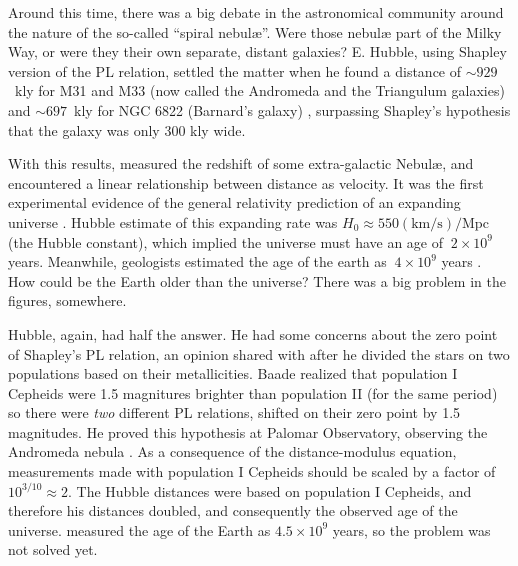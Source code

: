 
Around this time, there was a big debate in the astronomical community around the nature of the so-called \enquote{spiral nebul\ae{}}.
Were those nebul\ae{} part of the Milky Way, or were they their own separate, distant galaxies?
E. Hubble, using Shapley version of the PL relation, settled the matter when he found a distance of $\sim929$~kly for M31 and M33 
(now called the Andromeda and the Triangulum galaxies) and $\sim697$~kly for NGC 6822 (Barnard's galaxy) \citep{Hubble1925a,Hubble1925b}, 
surpassing Shapley's hypothesis that the galaxy was only 300 kly wide.


With this results, \cite{Hubble1929} measured the redshift of some extra-galactic Nebul\ae{}, 
and encountered a linear relationship between distance as velocity.
It was the first experimental evidence of the general relativity prediction of an expanding universe \citep{Fiedmann1922,Lemaitre1927}.
Hubble estimate of this expanding rate was $H_0 \approx 550 (\text{km}/\text{s})/\text{Mpc}$ (the Hubble constant), 
which implied the universe must have an age of $~2\times10^9$ years. 
Meanwhile, geologists estimated the age of the earth as $~4\times10^9$ years \citep[see][ for an historical account]{Dalrymple1994}.
How could be the Earth older than the universe? There was a big problem in the figures, somewhere.


Hubble, again, had half the answer. He had some concerns about the zero point of Shapley's PL relation, 
an opinion shared with \cite{Baade1944} after he divided the stars on two populations based on their metallicities.
Baade realized that population I Cepheids were 1.5 magnitures brighter than population II (for the same period) 
so there were \textit{two} different PL relations, shifted on their zero point by 1.5 magnitudes.
He proved this hypothesis at Palomar Observatory, observing the Andromeda nebula \citep{Baade1956} \citep[see][for another discussion]{Arp1955}.
As a consequence of the distance-modulus equation, measurements made with population I Cepheids should be scaled by a factor of $10^{3/10}\approx 2$.
The Hubble distances were based on population I Cepheids, and  therefore his distances doubled, and consequently the observed age of the universe.
\cite{Patterson1955} measured the age of the Earth as $4.5\times10^9$ years, so the problem was not solved yet.

